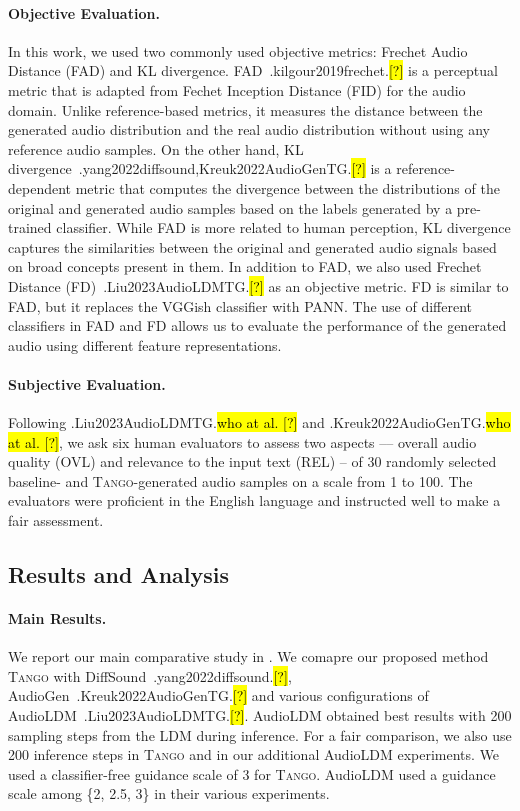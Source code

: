 \documentclass{article}
\newcommand{\model}{\textsc{Tango}}
\let\realcite\cite
\renewcommand{\cite}[1]{\ifx.#1.\hl{[?]}\else\realcite{#1}\fi}
\let\realcitet\citet
\renewcommand{\citet}[1]{\ifx.#1.\hl{who at al. [?]}\else\realcitet{#1}\fi}
\begin{document}
\paragraph{Objective Evaluation.}
 In this work, we used two commonly used objective metrics: Frechet Audio Distance (FAD) and KL divergence. FAD~\cite{kilgour2019frechet} is a perceptual metric that is adapted from Fechet Inception Distance (FID) for the audio domain. Unlike reference-based metrics, it measures the distance between the generated audio distribution and the real audio distribution without using any reference audio samples. On the other hand, KL divergence~\cite{yang2022diffsound,Kreuk2022AudioGenTG} is a reference-dependent metric that computes the divergence between the distributions of the original and generated audio samples based on the labels generated by a pre-trained classifier. While FAD is more related to human perception, KL divergence captures the similarities between the original and generated audio signals based on broad concepts present in them. In addition to FAD, we also used Frechet Distance (FD)~\cite{Liu2023AudioLDMTG} as an objective metric. FD is similar to FAD, but it replaces the VGGish classifier with PANN. The use of different classifiers in FAD and FD allows us to evaluate the performance of the generated audio using different feature representations.
\paragraph{Subjective Evaluation.}

Following \citet{Liu2023AudioLDMTG} and \citet{Kreuk2022AudioGenTG}, we ask six human evaluators to assess two aspects –– overall audio quality (OVL) and relevance to the input text (REL) -- of 30 randomly selected baseline- and \model{}-generated audio samples on a scale from 1 to 100. The evaluators were proficient in the English language and instructed well to make a fair assessment.

\subsection{Results and Analysis}
\paragraph{Main Results.}
We report our main comparative study in . We comapre our proposed method \model{} with DiffSound~\cite{yang2022diffsound}, AudioGen~\cite{Kreuk2022AudioGenTG} and various configurations of AudioLDM~\cite{Liu2023AudioLDMTG}. AudioLDM obtained best results with 200 sampling steps from the LDM during inference. For a fair comparison, we also use 200 inference steps in \model{} and in our additional AudioLDM experiments. We used a classifier-free guidance scale of 3 for \model{}. AudioLDM used a guidance scale among \{2, 2.5, 3\} in their various experiments.
\end{document}
